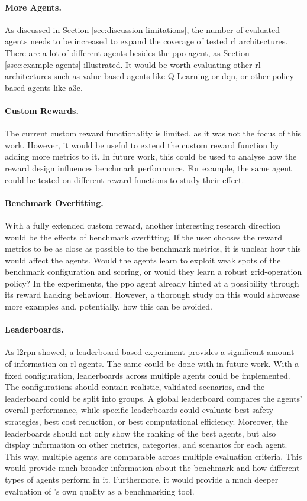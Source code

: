 \paragraph{More Agents.}
As discussed in Section \ref{sec:discussion-limitations}, the number of evaluated agents needs to be increased to expand the coverage of tested \ac{rl} architectures. There are a lot of different agents besides the \ac{ppo} agent, as Section \ref{ssec:example-agents} illustrated. It would be worth evaluating other \ac{rl} architectures such as value-based agents like Q-Learning or \ac{dqn}, or other policy-based agents like \ac{a3c}.

\paragraph{Custom Rewards.}
The current custom reward functionality is limited, as it was not the focus of this work. However, it would be useful to extend the custom reward function by adding more metrics to it. In future work, this could be used to analyse how the reward design influences benchmark performance. For example, the same agent could be tested on different reward functions to study their effect.

\paragraph{Benchmark Overfitting.}
With a fully extended custom reward, another interesting research direction would be the effects of benchmark overfitting. If the user chooses the reward metrics to be as close as possible to the benchmark metrics, it is unclear how this would affect the agents. Would the agents learn to exploit weak spots of the benchmark configuration and scoring, or would they learn a robust grid-operation policy? In the experiments, the \ac{ppo} agent already hinted at a possibility through its reward hacking behaviour. However, a thorough study on this would showcase more examples and, potentially, how this can be avoided.

\paragraph{Leaderboards.}
As \ac{l2rpn} showed, a leaderboard-based experiment provides a significant amount of information on \ac{rl} agents. The same could be done with \benchmark in future work. With a fixed configuration, leaderboards across multiple agents could be implemented. The configurations should contain realistic, validated scenarios, and the leaderboard could be split into groups. A global leaderboard compares the agents' overall performance, while specific leaderboards could evaluate best safety strategies, best cost reduction, or best computational efficiency. Moreover, the leaderboards should not only show the ranking of the best agents, but also display information on other metrics, categories, and scenarios for each agent. This way, multiple agents are comparable across multiple evaluation criteria. This would provide much broader information about the benchmark and how different types of agents perform in it. Furthermore, it would provide a much deeper evaluation of \benchmark's own quality as a benchmarking tool. 